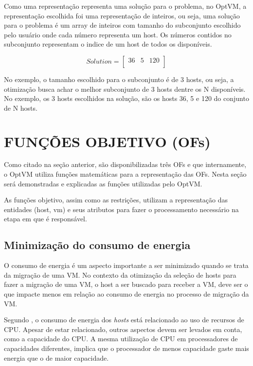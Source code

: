 Como uma representação representa uma solução para o problema, no OptVM, a 
representação escolhida foi uma representação de inteiros, ou seja, uma solução
para o problema é um array de inteiros com tamanho do subconjunto escolhido pelo
usuário onde cada número representa um host. Os números contidos no subconjunto
representam o indice de um host de todos os disponíveis.

\[
  Solution=
  \left[{\begin{array}{cccccc}
    36 & 5 & 120 \\
  \end{array}}\right
  ]
\]

No exemplo, o tamanho escolhido para o subconjunto é de 3 hosts, ou seja, 
a otimização busca achar o melhor subconjunto de 3 hosts dentre os N disponíveis. 
No exemplo, os 3 hosts escolhidos na solução, são os hosts 36, 5 e 120 do conjunto de N hosts.

\section{FUNÇÕES OBJETIVO (OFs)}
Como citado na seção anterior, são disponibilizadas três OFs e que internamente, o OptVM
utiliza funções matemáticas para a representação das OFs. Nesta seção será demonstradas e
explicadas as funções utilizadas pelo OptVM.

As funções objetivo, assim como as restrições, utilizam a representação das entidades 
(host, vm) e seus atributos para fazer o processamento necessário na etapa em que é responsável.

\subsection{Minimização do consumo de energia}
O consumo de energia é um aspecto importante a ser minimizado quando
se trata da migração de uma VM. No contexto da otimização da seleção 
de hosts para fazer a migração de uma VM, o host a ser buscado
para receber a VM, deve ser o que impacte menos em relação ao consumo de 
energia no processo de migração da VM.

Segundo \cite{beloglazov}, o consumo de energia dos \textit{hosts} está relacionado
ao uso de recursos de CPU. Apesar de estar relacionado, outros aspectos devem ser levados
em conta, como a capacidade do CPU. A mesma utilização de CPU em processadores de capacidades
diferentes, implica que o processador de menos capacidade gaste mais energia que o de maior capacidade.

